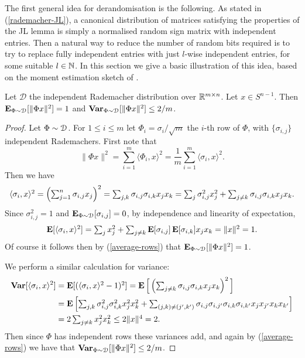 The first general idea for derandomisation is the following. As stated
in (\ref{rademacher-JL}), a canonical distribution of matrices
satisfying the properties of the JL lemma is simply a normalised
random sign matrix with independent entries. Then a natural way to
reduce the number of random bits required is to try to replace fully
independent entries with just $l$-wise independent entries, for some
suitable $l \in \mathbb{N}$. In this section we give a basic illustration of
this idea, based on the moment estimation sketch of \cite{alon-1996}.

\begin{proposition}
  \label{warmup-dumb}
  Let $\mathcal{D}$ the independent Rademacher distribution over
  $\mathbb{R}^{m \times n}$. Let $x \in S^{n-1}$. Then $\operatorname*{\mathbf{E}}_{\Phi \sim
    \mathcal{D}}[\|\Phi x\|^2] = 1$ and $\operatorname*{\mathbf{Var}}_{\Phi \sim \mathcal{D}}[\|\Phi x\|^2] \le
  2/m$.
\end{proposition}

\begin{proof}
  Let $\Phi \sim \mathcal{D}$. For $1 \le i \le m$ let $\Phi_i =
  \sigma_i/\sqrt{m}$ the $i$-th row of $\Phi$, with $\{\sigma_{i,j}\}$
  independent Rademachers. First note that
  \begin{equation}
    \label{average-rows}
    \textstyle{\|\Phi x\|^2 = \sum_{i=1}^m \langle \Phi_i, x \rangle^2
      = \frac{1}{m} \sum_{i=1}^m \langle \sigma_i, x \rangle^2}.
  \end{equation}
  Then we have
  \[
  \textstyle{\langle \sigma_i, x \rangle^2 = \left(\sum_{j=1}^n
    \sigma_{i,j} x_j \right)^2 = \sum_{j,k} \sigma_{i,j}\sigma_{i,k}
    x_jx_k = \sum_j \sigma_{i,j}^2 x_j^2 + \sum_{j \ne k}
    \sigma_{i,j}\sigma_{i,k} x_jx_k.}
  \]
  Since $\sigma_{i,j}^2 = 1$ and $\operatorname*{\mathbf{E}}_{\Phi \sim \mathcal{D}}[\sigma_{i,j}] =
  0$, by independence and linearity of expectation,
  \[
  \textstyle{\operatorname*{\mathbf{E}}[\langle \sigma_i, x \rangle^2] = \sum_j x_j^2 +
    \sum_{j \ne k} \operatorname*{\mathbf{E}}[\sigma_{i,j}]\operatorname*{\mathbf{E}}[\sigma_{i,k}] x_jx_k} = \|x\|^2
  = 1.
  \]
  Of course it follows then by (\ref{average-rows}) that $\operatorname*{\mathbf{E}}_{\Phi
    \sim \mathcal{D}}[\|\Phi x\|^2] = 1$.

  We perform a similar calculation for variance:
  \begin{align*}
  \operatorname*{\mathbf{Var}}[\langle \sigma_i, x \rangle^2] &= \textstyle{\operatorname*{\mathbf{E}}[(\langle
      \sigma_i, x \rangle^2 - 1)^2] = \operatorname*{\mathbf{E}}\Big[\left(\sum_{j \ne k}
      \sigma_{i,j}\sigma_{i,k} x_jx_k\right)^2\Big]} \\ &= \textstyle{\operatorname*{\mathbf{E}}\left[
      \sum_{j,k} \sigma_{i,j}^2\sigma_{i,k}^2x_j^2x_k^2 + \sum_{(j,k)
        \ne (j',k')}
      \sigma_{i,j}\sigma_{i,j'}\sigma_{i,k}\sigma_{i,k'}
      x_jx_{j'}x_kx_{k'}\right]} \\ &= \textstyle{2 \sum_{j \ne k}
    x_j^2x_k^2 \le 2 \|x\|^4} = 2.
  \end{align*}
  Then since $\Phi$ has independent rows these variances add, and
  again by (\ref{average-rows}) we have that $\operatorname*{\mathbf{Var}}_{\Phi \sim
    \mathcal{D}}[\|\Phi x\|^2] \le 2/m$.
\end{proof}

